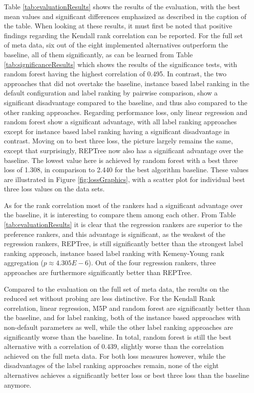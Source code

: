 Table \ref{tab:evaluationResults} shows the results of the evaluation, with the best mean values and significant differences emphasized as described in the caption of the table. When looking at these results, it must first be noted that positive findings regarding the Kendall rank correlation can be reported. For the full set of meta data, six out of the eight implemented alternatives outperform the baseline, all of them significantly, as can be learned from Table \ref{tab:significanceResults} which shows the results of the significance tests, with random forest having the highest correlation of 0.495. In contrast, the two approaches that did not overtake the baseline, instance based label ranking in the default configuration and label ranking by pairwise comparison, show a significant disadvantage compared to the baseline, and thus also compared to the other ranking approaches. Regarding performance loss, only linear regression and random forest show a significant advantage, with all label ranking approaches except for instance based label ranking having a significant disadvantage in contrast. Moving on to best three loss, the picture largely remains the same, except that surprisingly, REPTree now also has a significant advantage over the baseline. The lowest value here is achieved by random forest with a best three loss of 1.308, in comparison to 2.440 for the best algorithm baseline. These values are illustrated in Figure \ref{fig:lossGraphics}, with a scatter plot for individual best three loss values on the data sets.

As for the rank correlation most of the rankers had a significant advantage over the baseline, it is interesting to compare them among each other. From Table \ref{tab:evaluationResults} it is clear that the regression rankers are superior to the preference rankers, and this advantage is significant, as the weakest of the regression rankers, REPTree, is still significantly better than the strongest label ranking approach, instance based label ranking with Kemeny-Young rank aggregation ($p \approx 4.305E-6$). Out of the four regression rankers, three approaches are furthermore significantly better than REPTree. 

Compared to the evaluation on the full set of meta data, the results on the reduced set without probing are less distinctive. For the Kendall Rank correlation, linear regression, M5P and random forest are significantly better than the baseline, and for label ranking, both of the instance based approaches with non-default parameters as well, while the other label ranking approaches are significantly worse than the baseline. In total, random forest is still the best alternative with a correlation of 0.439, slightly worse than the correlation achieved on the full meta data. For both loss measures however, while the disadvantages of the label ranking approaches remain, none of the eight alternatives achieves a significantly better loss or best three loss than the baseline anymore.

